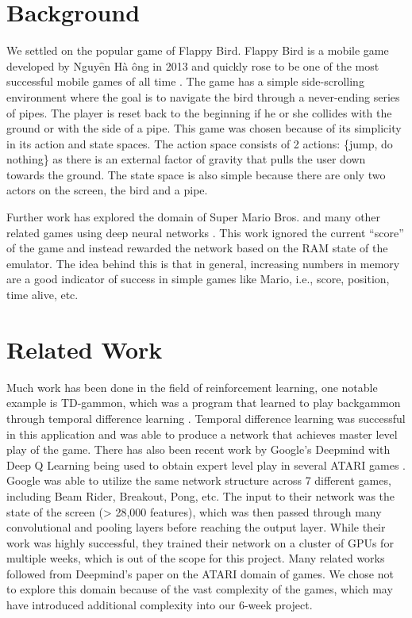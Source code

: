 \documentclass{chi2009}
\begin{document}
\section{Background}

We settled on the popular game of Flappy Bird. Flappy Bird is a mobile game developed by Nguy$\hat{\text{\~e}}$n H\`a \DH\^ong in 2013 and quickly rose to be one of the most successful mobile games of all time \cite{nguyen2013flappy}. The game has a simple side-scrolling environment where the goal is to navigate the bird through a never-ending series of pipes. The player is reset back to the beginning if he or she collides with the ground or with the side of a pipe. This game was chosen because of its simplicity in its action and state spaces. The action space consists of 2 actions: \{jump, do nothing\} as there is an external factor of gravity that pulls the user down towards the ground. The state space is also simple because there are only two actors on the screen, the bird and a pipe.

Further work has explored the domain of Super Mario Bros. and many other related games using deep neural networks \cite{murphy2013first}. This work ignored the current ``score'' of the game and instead rewarded the network based on the RAM state of the emulator. The idea behind this is that in general, increasing numbers in memory are a good indicator of success in simple games like Mario, i.e., score, position, time alive, etc.

\section{Related Work}

Much work has been done in the field of reinforcement learning, one notable example is TD-gammon, which was a program that learned to play backgammon through temporal difference learning \cite{tesauro1995temporal}. Temporal difference learning was successful in this application and was able to produce a network that achieves master level play of the game. There has also been recent work by Google's Deepmind with Deep Q Learning being used to obtain expert level play in several ATARI games \cite{mnih2013playing}. Google was able to utilize the same network structure across 7 different games, including Beam Rider, Breakout, Pong, etc. The input to their network was the state of the screen (> 28,000 features), which was then passed through many convolutional and pooling layers before reaching the output layer. While their work was highly successful, they trained their network on a cluster of GPUs for multiple weeks, which is out of the scope for this project. Many related works followed from Deepmind's paper on the ATARI domain of games. We chose not to explore this domain because of the vast complexity of the games, which may have introduced additional complexity into our 6-week project.
\end{document}
